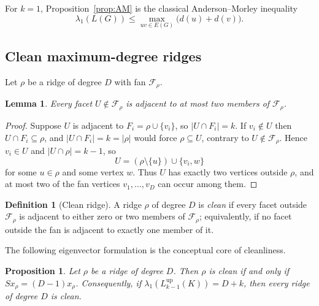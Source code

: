 \documentclass[11pt,reqno]{amsart}
\numberwithin{equation}{section}
\theoremstyle{plain}
\newtheorem{lemma}[theorem]{Lemma}
\newtheorem{proposition}[theorem]{Proposition}
\theoremstyle{definition}
\newtheorem{definition}[theorem]{Definition}
\newcommand{\Lup}{L^{\mathrm{up}}}
\newcommand{\Fset}{\mathcal F}
\begin{document}
For $k=1$, Proposition~\ref{prop:AM} is the classical Anderson--Morley inequality
\[
  \lambda_1(L(G))\le\max_{uv\in E(G)}\bigl(d(u)+d(v)\bigr).
\]

\subsection{Clean maximum-degree ridges}

Let $\rho$ be a ridge of degree $D$ with fan $\Fset_\rho$.

\begin{lemma}\label{lem:atmosttwo}
Every facet $U\notin\Fset_\rho$ is adjacent to at most two members of $\Fset_\rho$.
\end{lemma}

\begin{proof}
Suppose $U$ is adjacent to $F_i=\rho\cup\{v_i\}$, so $|U\cap F_i|=k$. If $v_i\notin U$ then
$U\cap F_i\subseteq\rho$, and $|U\cap F_i|=k=|\rho|$ would force $\rho\subseteq U$, contrary to
$U\notin\Fset_\rho$. Hence $v_i\in U$ and $|U\cap\rho|=k-1$, so
\[
  U=(\rho\setminus\{u\})\cup\{v_i,w\}
\]
for some $u\in\rho$ and some vertex $w$. Thus $U$ has exactly two vertices outside $\rho$, and at
most two of the fan vertices $v_1,\dots,v_D$ can occur among them.
\end{proof}

\begin{definition}[Clean ridge]\label{def:clean}
A ridge $\rho$ of degree $D$ is \emph{clean} if every facet outside $\Fset_\rho$ is adjacent to
either zero or two members of $\Fset_\rho$; equivalently, if no facet outside the fan is adjacent
to exactly one member of it.
\end{definition}

The following eigenvector formulation is the conceptual core of cleanliness.

\begin{proposition}\label{prop:fanvector}
Let $\rho$ be a ridge of degree $D$. Then $\rho$ is clean if and only if
$Sx_\rho=(D-1)x_\rho$.
Consequently, if $\lambda_1(\Lup_{k-1}(K))=D+k$, then every ridge of degree $D$ is clean.
\end{proposition}
\end{document}

